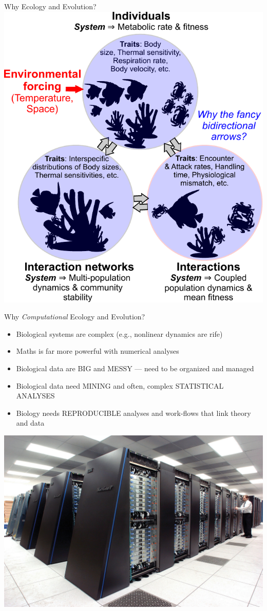 \documentclass[xcolor={usenames,x11names},compress]{beamer}
\renewcommand{\(}{\begin{columns}}
\renewcommand{\)}{\end{columns}}
\newcommand{\<}[1]{\begin{column}{#1}}
\renewcommand{\>}{\end{column}}
\begin{document}

\begin{frame}{Why Ecology and Evolution?}
\centering
	\includegraphics[width=.55\textwidth]{EcoEvoRoadmap.pdf}
\end{frame}

\begin{frame}{Why {\it Computational} Ecology and Evolution?}

  \begin{itemize}[<+->] \setlength{\itemindent}{0em}\itemsep3pt

    \item Biological systems are complex (e.g., nonlinear dynamics are rife)

    \item Maths is far more powerful with numerical analyses

		\item Biological data are BIG and MESSY --- need to be organized 
		and managed 

		\item Biological data need MINING and often, complex STATISTICAL ANALYSES

		\item Biology needs REPRODUCIBLE analyses and work-flows 
		that link theory and data 

  \end{itemize} 

\centering
  \includegraphics[width=.4\textwidth]{IBM_Blue_Gene.jpg}

\end{frame}
\end{document}
